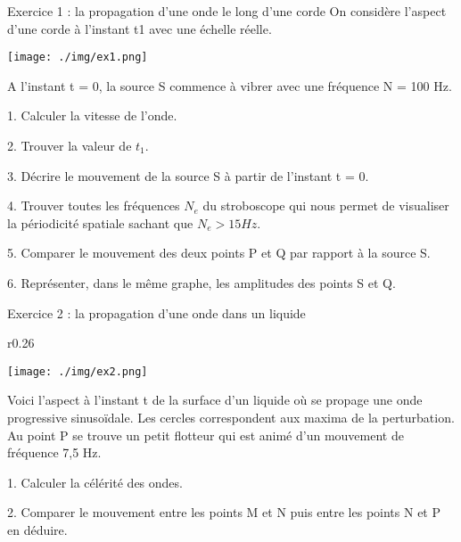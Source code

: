 \documentclass[12pt, french]{article}
\begin{document}
\begin{center}

\end{center}

\vspace{-0.4cm}
   \begin{Box2}{Exercice 1 :  la propagation d’une onde le long d’une corde}
On considère l'aspect d'une corde à l'instant t1 avec une échelle réelle.

  \begin{center}
	  \vspace{-0.2cm}
	\texttt{[image: ./img/ex1.png]}
  \end{center}

A l'instant t = 0, la source S commence à vibrer avec une fréquence N = 100 Hz. 

1. Calculer la vitesse de l'onde.

2. Trouver la valeur de $t_1$. 

3. Décrire le mouvement de la source S à partir de l'instant t = 0.

4. Trouver toutes les fréquences $N_e$ du stroboscope qui nous permet de visualiser la périodicité spatiale sachant que $N_e > 15 Hz$.

5. Comparer le mouvement des deux points P et Q par rapport à la source S.

6. Représenter, dans le même graphe, les amplitudes des points S et Q.

   \end{Box2}


\begin{Box2}{Exercice 2 :   la propagation d’une onde dans un liquide }
\begin{wrapfigure}{r}{0.26\textwidth}
  \begin{center}
	  \vspace{-1cm}
	\texttt{[image: ./img/ex2.png]}
  \end{center}
\end{wrapfigure}
Voici l'aspect à l'instant t de la surface d'un liquide où
se propage une onde progressive sinusoïdale. Les cercles
correspondent aux maxima de la perturbation.
Au point P se trouve un petit flotteur qui est animé
d'un mouvement de fréquence 7,5 Hz.

1. Calculer la célérité des ondes.

2. Comparer le mouvement entre les points M et N puis entre les points N et P en déduire.

\end{Box2}
\end{document}
